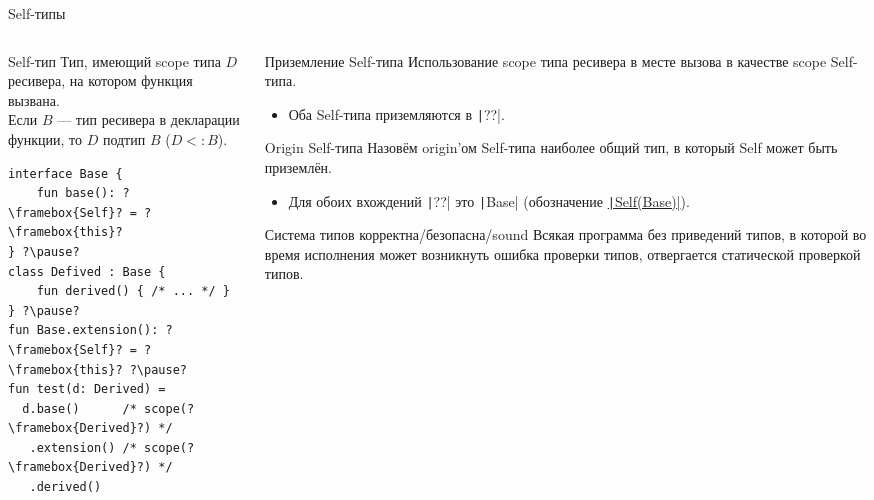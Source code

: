 \documentclass[handout,aspectratio=169,usenames,dvipsnames]{beamer}
\begin{document}
\begin{frame}[fragile]{Self-типы}
    \begin{columns}[onlytextwidth]
        \begin{column}{0.47\textwidth}
            \vspace{-0em}
            \begin{block}{Self-тип}
                Тип, имеющий scope типа $D$ ресивера, на котором функция вызвана. \\ Если $B$ --- тип ресивера в декларации функции, то $D$ подтип $B$ (\underline{$D <: B$}).
                \pause
                \begin{verbatim}
interface Base {
    fun base(): ?\framebox{Self}? = ?\framebox{this}?
} ?\pause?
class Defived : Base {
    fun derived() { /* ... */ }
} ?\pause?
fun Base.extension(): ?\framebox{Self}? = ?\framebox{this}? ?\pause?
fun test(d: Derived) =
  d.base()      /* scope(?\framebox{Derived}?) */
   .extension() /* scope(?\framebox{Derived}?) */
   .derived()
                \end{verbatim}
            \end{block}
        \end{column}\hfill%
        \begin{column}{0.50\textwidth}
            \pause
            \vspace{-0.6em}
            \begin{block}{Приземление Self-типа}
                Использование scope типа ресивера в месте вызова в качестве scope Self-типа. \pause

                \begin{itemize}
                    \item Оба Self-типа приземляются в \texttt|??|.
                \end{itemize}
            \end{block}

            \pause
            \begin{block}{Origin Self-типа}
                Назовём origin'ом Self-типа наиболее общий тип, в который Self может быть приземлён. \pause

                \begin{itemize}
                    \item Для обоих вхождений \texttt|??| это \texttt|Base| (обозначение \underline{\texttt|Self(Base)|}).
                \end{itemize}
            \end{block}

            \pause
            \begin{block}{Система типов корректна/безопасна/sound}
                Всякая программа без приведений типов, в которой во время исполнения может возникнуть ошибка проверки типов, отвергается статической проверкой типов.
            \end{block}
        \end{column}
    \end{columns}
\end{frame}
\end{document}

